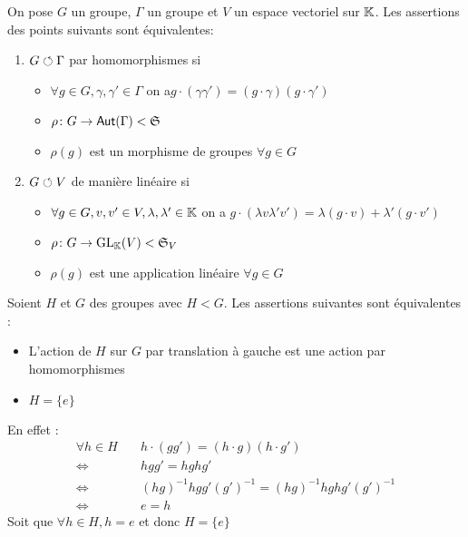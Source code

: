 \documentclass[french,a4paper,10pt]{article}
\begin{document}
	\begin{definition}
		On pose $G$ un groupe, $\Gamma$ un groupe et $V$ un espace vectoriel sur $\mathbb{K}$. Les assertions des points suivants sont équivalentes:
			\begin{enumerate}[label=$(\roman*)$]
				\item $G\circlearrowleft \Gamma$ par homomorphismes si 
					\begin{itemize}
						\item $\forall g\in G,\gamma,\gamma'\in\Gamma$ on a$ g\cdot(\gamma\gamma')=(g\cdot \gamma)(g\cdot \gamma')$
						\item $\rho\colon G\to\operatorname{\mathsf{Aut}}(\Gamma)<\mathfrak S$
						\item $\rho(g)$ est un morphisme de groupes $\forall g\in G$
					\end{itemize}
				
				\item $G\circlearrowleft V$ de manière linéaire si 
					\begin{itemize}
						\item $\forall g\in G,v,v'\in V,\lambda,\lambda'\in\mathbb{K}$ on a $g\cdot(\lambda v\lambda'v')=\lambda(g\cdot v)+\lambda'(g\cdot v')$
						\item $\rho\colon G\to \text{GL}_{\mathbb{K}}(V)<\mathfrak{S}_V$
						\item $\rho(g)$ est une application linéaire $\forall g\in G$
					\end{itemize}
			\end{enumerate}
	\end{definition}
	\begin{example}
		Soient $H$ et $G$ des groupes avec $H<G$. Les assertions suivantes sont équivalentes :
		\begin{itemize}
			\item L'action de $H$ sur $G$ par translation à gauche est une action par homomorphismes
			\item $H=\{e\}$
		\end{itemize}
		En effet :
			\[\begin{aligned}
				\forall h\in H\quad
				&h\cdot(gg')=(h\cdot g)(h\cdot g')\\
				\Longleftrightarrow &hgg'=hghg'\\
				\Longleftrightarrow& (hg)^{-1}hgg'(g')^{-1}=(hg)^{-1}hghg'(g')^{-1}\\
				\Longleftrightarrow&e=h
			\end{aligned}\]
		Soit que $\forall h\in H,h=e$ et donc $H=\{e\}$
	\end{example}
\end{document}
